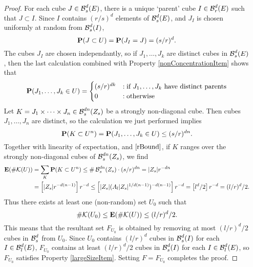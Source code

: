 \begin{proof}
	For each cube $J \in \operatorname{\mathcal{B}}_s^d(E)$, there is a unique `parent' cube $I \in \operatorname{\mathcal{B}}_r^d(E)$ such that $J \subset I$. Since $I$ contains $(r/s)^d$ elements of $\operatorname{\mathcal{B}}^d_s(E)$, and $J_I$ is chosen uniformly at random from $\operatorname{\mathcal{B}}^d_s(I)$,
	\[ \operatorname{\mathbf{P}}(J \subset U) = \operatorname{\mathbf{P}}(J_I = J) = (s/r)^d. \]
	The cubes $J_I$ are chosen independantly, so if $J_1, \dots, J_k$ are distinct cubes in $\operatorname{\mathcal{B}}^d_s(E)$, then the last calculation combined with Property \ref{nonConcentrationItem} shows that
\[ 		\operatorname{\mathbf{P}}(J_1, \dots, J_k \in U) = \begin{cases} (s/r)^{dk} &: \text{if $J_1, \dots, J_k$ have distinct parents} \\ 0 &: \text{otherwise} \end{cases} \]
	Let $K = J_1 \times \dots \times J_n \in \operatorname{\mathcal{B}}^{dn}_s(Z_s)$ be a strongly non-diagonal cube. Then cubes $J_1, \dots, J_n$ are distinct, so the calculation we just performed implies
	\[	\operatorname{\mathbf{P}}(K \subset U^n) = \operatorname{\mathbf{P}}(J_1, \dots, J_k \in U) \leq (s/r)^{dn}. \]
	Together with linearity of expectation, and $\eqref{rBound}$, if $K$ ranges over the strongly non-diagonal cubes of $\operatorname{\mathcal{B}}^{dn}_s(Z_s)$, we find
	\begin{align*}
		\operatorname{\mathbf{E}}(\# \mathcal{K}(U)) &= \sum_K \operatorname{\mathbf{P}}(K \subset U^n) \leq \# \operatorname{\mathcal{B}}_s^{dn}(Z_s) \cdot (s/r)^{dn} = |Z_s| r^{-dn}\\
		&= \left[ |Z_s| r^{-d(n-1)} \right] r^{-d} \leq \left[ |Z_s| (A_l |Z_s|^{1/d(n-1)})^{-d(n-1)} \right] r^{-d} = \left[ l^d/2 \right] r^{-d} = (l/r)^d /2.
	\end{align*}
	Thus there exists at least one (non-random) set $U_0$ such that
	\begin{equation}\label{KU0Small}
		\# \mathcal{K}(U_0) \leq \operatorname{\mathbf{E}}(\# \mathcal{K}(U)) \leq (l/r)^d/2.
	\end{equation}
	This means that the resultant set $F_{U_0}$ is obtained by removing at most $(l/r)^d/2$ cubes in $\operatorname{\mathcal{B}}^d_s$ from $U_0$. Since $U_0$ contains $(l/r)^d$ cubes in $\operatorname{\mathcal{B}}^d_s(I)$ for each $I \in \operatorname{\mathcal{B}}^d_l(E)$, $F_{U_0}$ contains at least $(l/r)^d/2$ cubes in $\operatorname{\mathcal{B}}^d_s(I)$ for each $I \in \operatorname{\mathcal{B}}^d_l(E)$, so $F_{U_0}$ satisfies Property \ref{largeSizeItem}. Setting $F = F_{U_0}$ completes the proof.
\end{proof}

